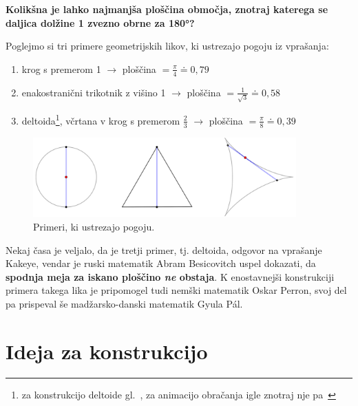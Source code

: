 \documentclass[a4paper, 12pt]{article}
\begin{document}
\vspace{0.2cm}
\begin{center}
    \textbf{Kolikšna je lahko najmanjša ploščina območja, znotraj katerega se daljica dolžine 1 zvezno obrne za 180°?}
\end{center}
\vspace{0.2cm}

\noindent Poglejmo si tri primere geometrijskih likov, ki ustrezajo pogoju iz vprašanja:

\begin{enumerate}
    \item krog s premerom 1 $ \rightarrow $ ploščina $ = \frac{\pi}{4} \doteq 0{,}79 $
    \item enakostranični trikotnik z višino 1 $ \rightarrow $ ploščina $ = \frac{1}{\sqrt{3}} \doteq 0{,}58 $
    \item deltoida\footnote{za konstrukcijo deltoide gl.~\cite{deltoida}, za animacijo obračanja igle znotraj nje pa~\cite{kakeya_wiki}}, včrtana v krog s premerom $ \frac{2}{3} $ $ \rightarrow $ ploščina $ = \frac{\pi}{8} \doteq 0{,}39 $
\end{enumerate}

\begin{figure}[h!]
    \centering
    \includegraphics[width=0.9\textwidth]{geogebra_slike/prevelike_ploscine.png}
    \caption{Primeri, ki ustrezajo pogoju.}
    \label{primeri}
\end{figure}

Nekaj časa je veljalo, da je tretji primer, tj. deltoida, odgovor na vprašanje Kakeye, vendar je ruski matematik Abram Besicovitch uspel dokazati, da \textbf{spodnja meja za iskano ploščino \emph{ne} obstaja}. K enostavnejši konstrukciji primera takega lika je pripomogel tudi nemški matematik Oskar Perron, svoj del pa prispeval še madžarsko-danski matematik Gyula Pál.


\section*{Ideja za konstrukcijo}
\end{document}
